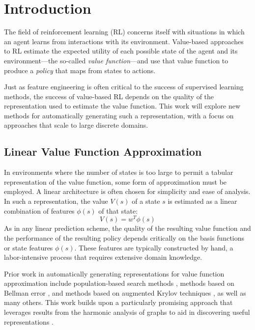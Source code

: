 \section{Introduction}

The field of reinforcement learning (RL) concerns itself with situations in
which an agent learns from interactions with its environment. Value-based
approaches to RL estimate the expected utility of each possible state of the
agent and its environment---the so-called \emph{value function}---and use that
value function to produce a \emph{policy} that maps from states to actions.

Just as feature engineering is often critical to the success of supervised
learning methods, the success of value-based RL depends on the quality of the
representation used to estimate the value function. This work will explore new
methods for automatically generating such a representation, with a focus on
approaches that scale to large discrete domains.

\subsection{Linear Value Function Approximation}

In environments where the number of states is too large to permit a tabular
representation of the value function, some form of approximation must be
employed. A linear architecture is often chosen for simplicity and ease of
analysis. In such a representation, the value $V(s)$ of a state $s$ is
estimated as a linear combination of features $\phi(s)$ of that state:
%
\begin{equation}
V(s) = w^{T}\phi(s)
\end{equation}
%
As in any linear prediction scheme, the quality of the resulting value function
and the performance of the resulting policy depends critically on the basis
functions or state features $\phi(s)$. These features are typically constructed
by hand, a labor-intensive process that requires extensive domain knowledge.

Prior work in automatically generating representations for value function
approximation include population-based search methods
\citep{whiteson2006evolutionary}, methods based on Bellman error
\citep{parr2007analyzing}, and methods based on augmented Krylov techniques
\citep{petrik2007analysis}, as well as many others. This work builds upon a
particularly promising approach that leverages results from the harmonic
analysis of graphs to aid in discovering useful representations
\citep{Mahadevan2006Value,Coifman06Diffusion,Wang2009Multiscale}.

